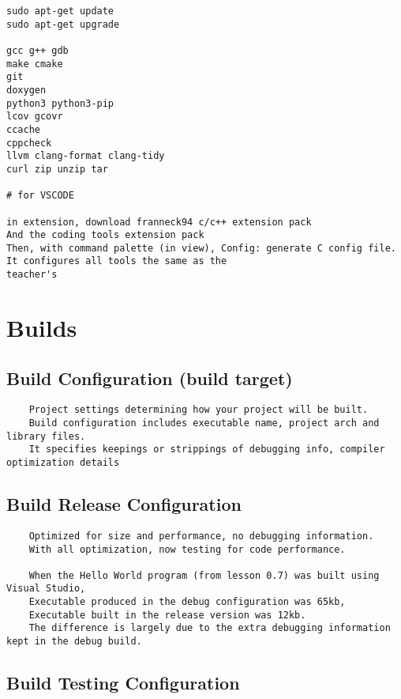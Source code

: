 \documentclass[openany]{report}
\begin{document}
\begin{verbatim}
sudo apt-get update
sudo apt-get upgrade

gcc g++ gdb
make cmake
git
doxygen
python3 python3-pip
lcov gcovr
ccache
cppcheck
llvm clang-format clang-tidy
curl zip unzip tar

# for VSCODE

in extension, download franneck94 c/c++ extension pack
And the coding tools extension pack
Then, with command palette (in view), Config: generate C config file. It configures all tools the same as the
teacher's
\end{verbatim}

\section{Builds}

\subsection{Build Configuration (build target)}

\begin{verbatim}
    Project settings determining how your project will be built. 
    Build configuration includes executable name, project arch and library files. 
    It specifies keepings or strippings of debugging info, compiler optimization details 
\end{verbatim}

\subsection{Build Release Configuration}

\begin{verbatim}
    Optimized for size and performance, no debugging information.
    With all optimization, now testing for code performance.

    When the Hello World program (from lesson 0.7) was built using Visual Studio,
    Executable produced in the debug configuration was 65kb, 
    Executable built in the release version was 12kb. 
    The difference is largely due to the extra debugging information kept in the debug build.
\end{verbatim}


\subsection{Build Testing Configuration}
\end{document}
